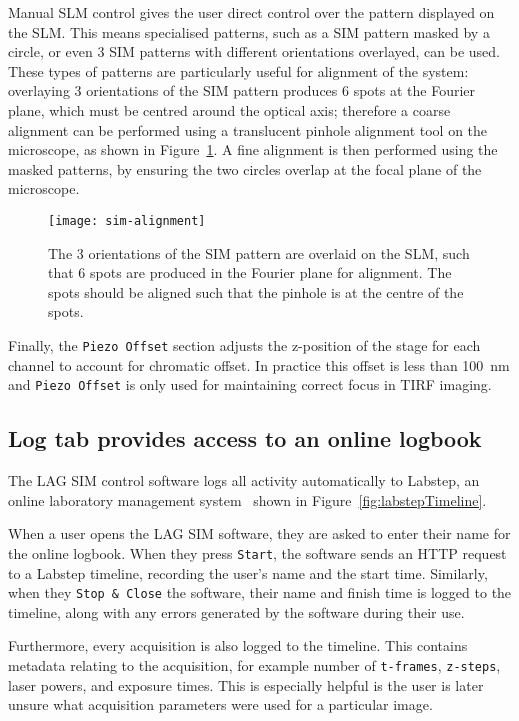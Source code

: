 Manual SLM control gives the user direct control over the pattern displayed on the SLM. 
This means specialised patterns, such as a SIM pattern masked by a circle, or even 3 SIM patterns with different orientations overlayed, can be used.
These types of patterns are particularly useful for alignment of the system: overlaying 3 orientations of the SIM pattern produces 6 spots at the Fourier plane, which must be centred around the optical axis; therefore a coarse alignment can be performed using a translucent pinhole alignment tool on the microscope, as shown in Figure~\ref{fig:pinhole-alignment}. 
A fine alignment is then performed using the masked patterns, by ensuring the two circles overlap at the focal plane of the microscope. 

\begin{figure}[htbp!]
\centering
\texttt{[image: sim-alignment]}
\caption[LAG SIM: Displaying specially designed patterns on the SLM assists with alignment of LAG SIM]{The 3 orientations of the SIM pattern are overlaid on the SLM, such that 6 spots are produced in the Fourier plane for alignment. The spots should be aligned such that the pinhole is at the centre of the spots.}
\label{fig:pinhole-alignment}
\end{figure}

Finally, the \texttt{Piezo Offset} section adjusts the z-position of the stage for each channel to account for chromatic offset. 
In practice this offset is less than \SI{100}{\nano\meter} and \texttt{Piezo Offset} is only used for maintaining correct focus in TIRF imaging. 

\subsection{Log tab provides access to an online logbook}
The LAG SIM control software logs all activity automatically to Labstep, an online laboratory management system~\cite{labstep} shown in Figure~\ref{fig:labstepTimeline}. 

When a user opens the LAG SIM software, they are asked to enter their name for the online logbook. 
When they press \texttt{Start}, the software sends an HTTP request to a Labstep timeline,  recording the user's name and the start time. 
Similarly, when they \texttt{Stop \& Close} the software, their name and finish time is logged to the timeline, along with any errors generated by the software during their use. 

Furthermore, every acquisition is also logged to the timeline. 
This contains metadata relating to the acquisition, for example number of \texttt{t-frames}, \texttt{z-steps}, laser powers, and exposure times. 
This is especially helpful is the user is later unsure what acquisition parameters were used for a particular image. 

